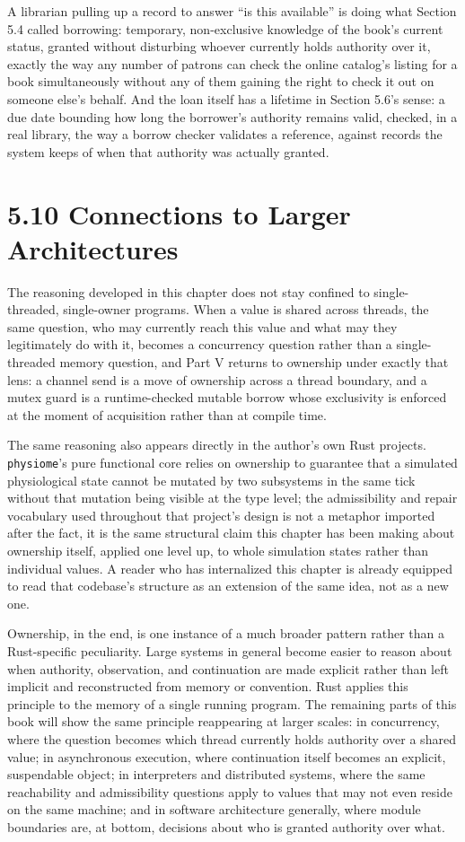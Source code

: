 \documentclass[11pt]{book}
\begin{document}
A librarian pulling up a record to answer ``is this available'' is doing what Section 5.4 called borrowing: temporary, non-exclusive knowledge of the book's current status, granted without disturbing whoever currently holds authority over it, exactly the way any number of patrons can check the online catalog's listing for a book simultaneously without any of them gaining the right to check it out on someone else's behalf. And the loan itself has a lifetime in Section 5.6's sense: a due date bounding how long the borrower's authority remains valid, checked, in a real library, the way a borrow checker validates a reference, against records the system keeps of when that authority was actually granted.

\section*{5.10 Connections to Larger Architectures}

The reasoning developed in this chapter does not stay confined to single-threaded, single-owner programs. When a value is shared across threads, the same question, who may currently reach this value and what may they legitimately do with it, becomes a concurrency question rather than a single-threaded memory question, and Part V returns to ownership under exactly that lens: a channel send is a move of ownership across a thread boundary, and a mutex guard is a runtime-checked mutable borrow whose exclusivity is enforced at the moment of acquisition rather than at compile time.

The same reasoning also appears directly in the author's own Rust projects. \texttt{physiome}'s pure functional core relies on ownership to guarantee that a simulated physiological state cannot be mutated by two subsystems in the same tick without that mutation being visible at the type level; the admissibility and repair vocabulary used throughout that project's design is not a metaphor imported after the fact, it is the same structural claim this chapter has been making about ownership itself, applied one level up, to whole simulation states rather than individual values. A reader who has internalized this chapter is already equipped to read that codebase's structure as an extension of the same idea, not as a new one.

Ownership, in the end, is one instance of a much broader pattern rather than a Rust-specific peculiarity. Large systems in general become easier to reason about when authority, observation, and continuation are made explicit rather than left implicit and reconstructed from memory or convention. Rust applies this principle to the memory of a single running program. The remaining parts of this book will show the same principle reappearing at larger scales: in concurrency, where the question becomes which thread currently holds authority over a shared value; in asynchronous execution, where continuation itself becomes an explicit, suspendable object; in interpreters and distributed systems, where the same reachability and admissibility questions apply to values that may not even reside on the same machine; and in software architecture generally, where module boundaries are, at bottom, decisions about who is granted authority over what.
\end{document}
